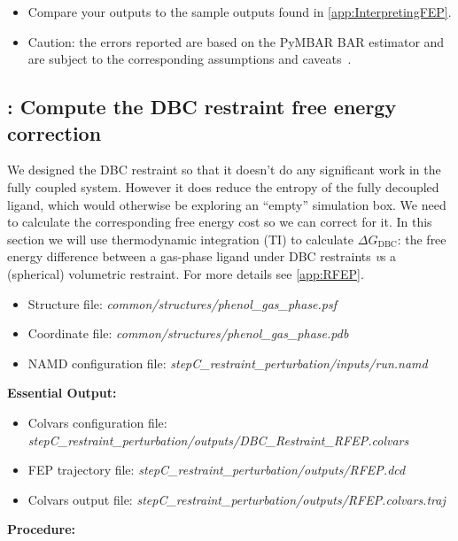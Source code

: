 \documentclass[9pt,tutorial]{Styling/livecoms}
\newcommand{\filepath}[1]{\textit{#1}}
\begin{document}
\begin{enumerate}
\begin{enumerate}[label=\alph*., ref=\theenumi.\alph*]
\begin{itemize}
            \label{fig:updatePaths}
            \item Compare your outputs to the sample outputs found in \ref{app:InterpretingFEP}.
            \item Caution: the errors reported are based on the PyMBAR BAR estimator and are subject to the corresponding assumptions and caveats~\cite{shirts2008statistically}.
        \end{itemize}
    \end{enumerate}
\end{enumerate}

\subsection{\hspace{-1em}: Compute the DBC restraint free energy correction}
\label{step:restraintPerturbation}
    \begin{tcolorbox}[colback=blue!5!white,colframe=blue!75!black]
    We designed the DBC restraint so that it doesn't do any significant work in the fully coupled system. However it does reduce the entropy of the fully decoupled ligand, which would otherwise be exploring an ``empty'' simulation box. We need to calculate the corresponding free energy cost so we can correct for it. In this section we will use thermodynamic integration (TI) to calculate $\Delta G_\mathrm{DBC}$: the free energy difference between a gas-phase ligand under DBC restraints {\textit vs} a (spherical) volumetric restraint. For more details see \ref{app:RFEP}.
    \end{tcolorbox}

    \begin{itemize}
        \item Structure file: \filepath{common/structures/phenol\_gas\_phase.psf} 
        \item Coordinate file: \filepath{common/structures/phenol\_gas\_phase.pdb}
        \item NAMD configuration file: \filepath{stepC\_restraint\_perturbation/inputs/run.namd}
    \end{itemize}
    \textbf{Essential Output:}
    \begin{itemize}
        \item Colvars configuration file: \filepath{stepC\_restraint\_perturbation/outputs/DBC\_Restraint\_RFEP.colvars}
        \item FEP trajectory file: \filepath{stepC\_restraint\_perturbation/outputs/RFEP.dcd}
        \item Colvars output file: \filepath{stepC\_restraint\_perturbation/outputs/RFEP.colvars.traj}
    \end{itemize}
    \textbf{Procedure:}
\end{document}
